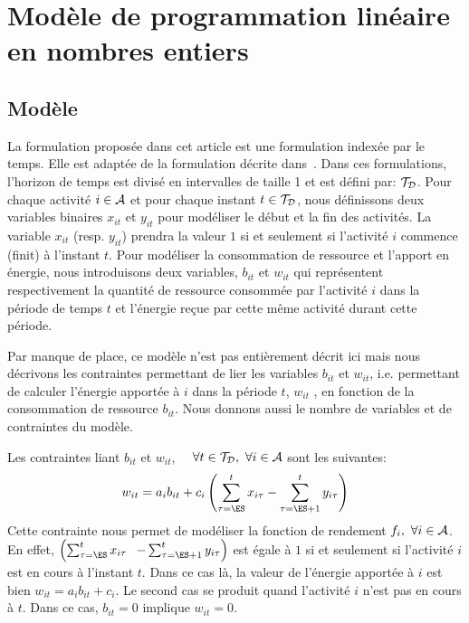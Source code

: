 \section{Modèle de programmation linéaire en nombres entiers}
\label{MIP}
\subsection{Modèle}
La formulation proposée dans cet article est une formulation indexée par
le temps. Elle est adaptée de la formulation décrite
dans~\cite{Nattaf2015}. 
Dans ces formulations, l'horizon de temps est divisé en
intervalles de taille 1 et est défini par: ${\cal T}_{\cal D}$. 
Pour chaque activité $i \in {\cal A}$ et pour chaque instant $t \in
{\cal T}_{\cal D}$, nous définissons deux variables binaires $x_{it}$
et $y_{it}$ pour modéliser le début et la fin des activités. La
variable $x_{it}$ (resp. $y_{it}$) prendra la valeur $1$ si et
seulement si l'activité $i$ commence (finit) à l'instant $t$.
Pour modéliser la consommation de ressource et l'apport en énergie,
nous introduisons deux variables, $b_{it}$ et $w_{it}$ qui
représentent respectivement la quantité de
ressource consommée par l'activité $i$ dans la période de temps
$t$ et l'énergie reçue par cette même activité durant cette période. 

Par manque de place, ce modèle n'est pas entièrement décrit ici mais
nous décrivons les contraintes permettant de lier les variables
$b_{it}$ et $w_{it}$, i.e. permettant de calculer l'énergie apportée à
$i$ dans la période $t$, $w_{it}$ , en fonction de la consommation de
ressource $b_{it}$. Nous donnons aussi le nombre de variables et de
contraintes du modèle.

Les contraintes liant $b_{it}$ et $w_{it}$, $\quad \forall t\in {\cal T}_{\cal D},\
\forall i \in {\cal A}$ sont les suivantes:
\begin{equation}  w_{it}=a_ib_{it}+c_i\left(\sum_{\tau=\ES}^t
x_{i\tau}-\sum_{\tau=\ES+1}^t y_{i\tau}\right)  \label{conv_CECSP_TI}
\end{equation} Cette contrainte nous permet de modéliser la fonction
de rendement $f_i,\ \forall i \in {\cal A}$. En effet,
$\left(\sum_{\tau=\ES}^t x_{i\tau}\right.$ $\left.-\sum_{\tau=\ES+1}^t
y_{i\tau}\right) $ est égale à $1$ si et seulement si l'activité $i$
est en cours à l'instant $t$.  Dans ce cas là, la valeur de l'énergie
apportée à $i$ est bien $w_{it}=a_ib_{it}+c_i$. Le second cas se
produit quand l'activité $i$ n'est pas en cours à $t$. Dans ce cas,
$b_{it}=0$ implique $w_{it}=0$.

